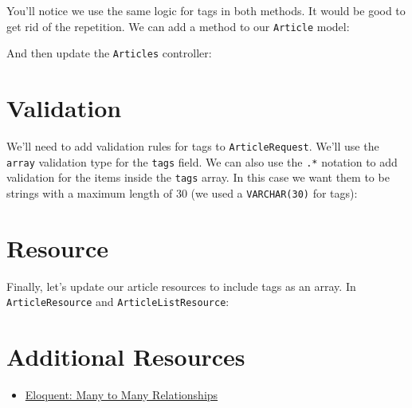 
You'll notice we use the same logic for tags in both methods. It would be good to get rid of the repetition. We can add a method to our \texttt{Article} model:


And then update the \texttt{Articles} controller:



\section{Validation}

We'll need to add validation rules for tags to \texttt{ArticleRequest}. We'll use the \texttt{array} validation type for the \texttt{tags} field. We can also use the \texttt{.*} notation to add validation for the items inside the \texttt{tags} array. In this case we want them to be strings with a maximum length of 30 (we used a \texttt{VARCHAR(30)} for tags):



\section{Resource}

Finally, let's update our article resources to include tags as an array. In \texttt{ArticleResource} and \texttt{ArticleListResource}:




\section{Additional Resources}

\begin{itemize}[leftmargin=*]
    \item \href{http://laravel.com/docs/master/eloquent-relationships#many-to-many}{Eloquent: Many to Many Relationships}
\end{itemize}
